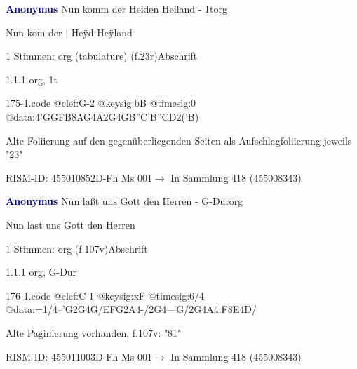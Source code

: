 \documentclass[twocolumn]{book}
\begin{document}
\par \vspace{7pt} \textcolor{darkblue}{\textbf{Anonymus  }}\hfillplus{\textbf{[175]}}\newline Nun komm der Heiden Heiland - 1t\newline org
\par \begin{itshape}[f.23r, at left:] Nun kom der | Heÿd Heÿland\end{itshape} 
\par \textcolor{darkblue}{}  1 Stimmen: org (tabulature)  (f.23r)\newline Abschrift
\par 1.1.1  org, 1t  
\begin{filecontents*}{175-1.code}
@clef:G-2
@keysig:bB
@timesig:0
@data:4'GGFB{8AG}4A2G4GB''C'B''CD2('B)
\end{filecontents*}
\newline
%
\par Alte Foliierung auf den gegenüberliegenden Seiten als Aufschlagfoliierung jeweils "23"
\par RISM-ID: 455010852\newline D-Fh  Ms 001\newline $\rightarrow$ In Sammlung 418 (455008343)
      
\par \vspace{7pt} \textcolor{darkblue}{\textbf{Anonymus  }}\hfillplus{\textbf{[176]}}\newline Nun laßt uns Gott den Herren - G-Dur\newline org
\par \begin{itshape}[f.107v, heading:] Nun last uns Gott den Herren\end{itshape} 
\par \textcolor{darkblue}{}  1 Stimmen: org  (f.107v)\newline Abschrift
\par 1.1.1  org, G-Dur  
\begin{filecontents*}{176-1.code}
@clef:C-1
@keysig:xF
@timesig:6/4
@data:=1/4--'G2G4G/EFG2A4-/2G4---G/2G4A4.F8E4D/
\end{filecontents*}
\newline
%
\par Alte Paginierung vorhanden, f.107v: "81"
\par RISM-ID: 455011003\newline D-Fh  Ms 001\newline $\rightarrow$ In Sammlung 418 (455008343)
      
\end{document}

